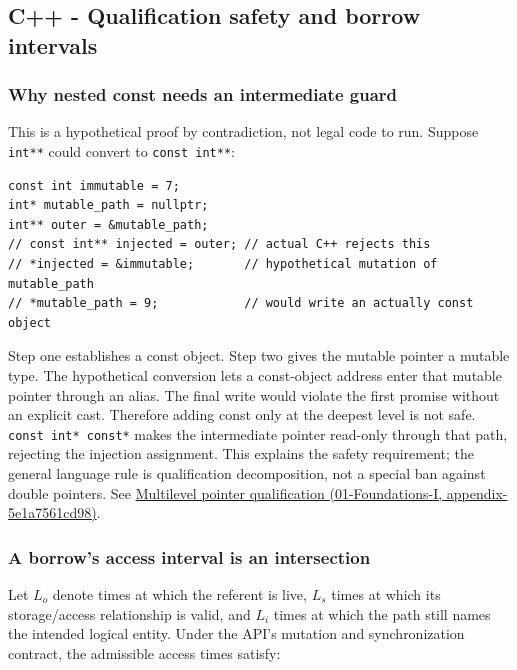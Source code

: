 \subsection{C++ - Qualification safety and borrow intervals}\label{c---qualification-safety-and-borrow-intervals}

\subsubsection{Why nested const needs an intermediate guard}\label{why-nested-const-needs-an-intermediate-guard}

This is a hypothetical proof by contradiction, not legal code to run. Suppose \texttt{int**} could convert to \texttt{const\ int**}:

\begin{verbatim}
const int immutable = 7;
int* mutable_path = nullptr;
int** outer = &mutable_path;
// const int** injected = outer; // actual C++ rejects this
// *injected = &immutable;       // hypothetical mutation of mutable_path
// *mutable_path = 9;            // would write an actually const object
\end{verbatim}

Step one establishes a const object. Step two gives the mutable pointer a mutable type. The hypothetical conversion lets a const-object address enter that mutable pointer through an alias. The final write would violate the first promise without an explicit cast. Therefore adding const only at the deepest level is not safe. \texttt{const\ int*\ const*} makes the intermediate pointer read-only through that path, rejecting the injection assignment. This explains the safety requirement; the general language rule is qualification decomposition, not a special ban against double pointers. See \href{}{Multilevel pointer qualification (01-Foundations-I, appendix-5e1a7561cd98)}.

\subsubsection{A borrow's access interval is an intersection}\label{a-borrows-access-interval-is-an-intersection}

Let \(L_o\) denote times at which the referent is live, \(L_s\) times at which its storage/access relationship is valid, and \(L_i\) times at which the path still names the intended logical entity. Under the API's mutation and synchronization contract, the admissible access times satisfy:

